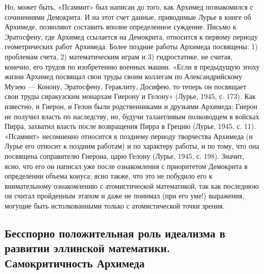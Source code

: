 Но, может быть, «Псаммит» был написан до того, как Архимед
познакомился с сочинениями Демокрита. И на этот счет данные,
приводимые Лурье в книге об Архимеде, позволяют составить вполне
определенное суждение. Письмо к Эратосфену, где Архимед ссылается на
Демокрита, относится к первому периоду геометрических работ Архимеда.
Более поздние работы Архимеда посвящены: 1) проблемам счета, 2)
математическим играм и 3) гидростатике, не считая, конечно, его трудов
по изобретению военных машин. «Если в предыдущую эпоху жизни Архимед
посвящал свои труды своим коллегам по Александрийскому Музею ---
Конону, Эратосфену, Гераклиту, Досифею, то теперь он посвящает свои
труды сиракузским монархам Гиерону и Гелону» (Лурье, 1945, с. 173).
Как известно, и Гиерон, и Гелон были родственниками и друзьями
Архимеда; Гиерон не получил власть по наследству, но, будучи
талантливым полководцем в войсках Пирра, захватил власть после
возвращения Пирра в Грецию (Лурье, 1945, с. 11). «Псаммит» несомненно
относится к позднему периоду творчества Архимеда (и Лурье его относит
к поздним работам) и по характеру работы, и по тому, что она посвящена
соправителю Гиерона, царю Гелону (Лурье, 1945, с. 198). Значит, ясно,
что его он написал уже после ознакомления с приоритетом Демокрита в
определении объема конуса; ясно также, что это не побудило его к
внимательному ознакомлению с атомистической математикой, так как
последнюю он считал пройденным этапом и даже не понимал (при его уме!)
выражения, могущие быть истолкованными только с атомистической точки
зрения.

\subsection{Бесспорно положительная роль идеализма в развитии
эллинской математики. Самокритичность Архимеда}

